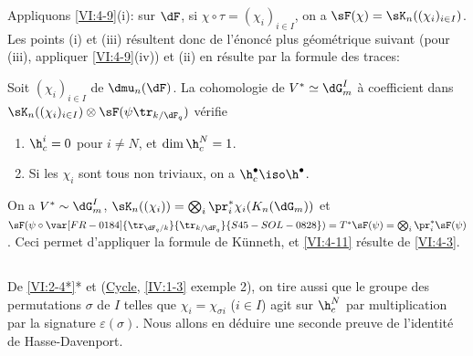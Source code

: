 Appliquons \ref{VI:4-9}(i): sur $\dF$, si $\chi\circ \tau=(\chi_i)_{i\in I}$, 
on a $\sF(\chi) = \sK_n((\chi_i)_{i\in I})$. Les points (i) et (iii) 
résultent donc de l'énoncé plus géométrique suivant (pour (iii), 
appliquer \ref{VI:4-9}(iv)) et (ii) en résulte par la formule des traces: 





\begin{proposition_}\label{VI:4-11}
Soit $(\chi_i)_{i\in I}$  de $\dmu_n(\dF)$. La 
cohomologie de $V^\ast\simeq \dG_m^I$ à coefficient dans 
$\sK_n((\chi_i)_{i\in I})\otimes \sF(\psi\tr_{k/\dF_q})$ vérifie 
\begin{enumerate}[\indent (i)]
  \item $\h_c^i{}=0$ pour $i\ne N$, et $\dim \h_c^N{} = 1$. 
  \item Si les $\chi_i$ sont tous non triviaux, on a 
    $\h_c^\bullet{}\iso \h^\bullet$. 
\end{enumerate}
\end{proposition_}

On a $V^\ast\sim \dG_m^I$, 
$\sK_n((\chi_i)) = \bigotimes_i \pr_i^\ast \chi_i(K_n(\dG_m))$ et 
$\sF(\psi\circ \var[FR-0184]{\tr_{\dF_q/k}}{\tr_{k/\dF_q}}{S45-SOL-0828})=T^\ast \sF(\psi) = \bigotimes_i \pr_i^\ast \sF(\psi)$. 
Ceci permet d'appliquer la formule de K\"unneth, et \ref{VI:4-11} résulte de 
\ref{VI:4-3}. 





\subsection{}\label{VI:4-12}

De \ref{VI:2-4*}* et (\hyperref[IV]{Cycle}, \ref{IV:1-3} exemple 2), on tire 
aussi que le groupe des permutations $\sigma$ de $I$ telles que 
$\chi_i = \chi_{\sigma i}$ ($i\in I$) agit sur $\h_c^N$ par multiplication par 
la signature $\varepsilon(\sigma)$. Nous allons en déduire une seconde preuve 
de l'identité de Hasse-Davenport. 

